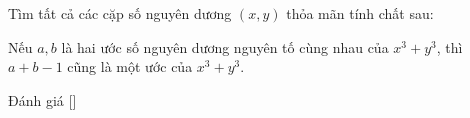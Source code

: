 \ifshowproblem
\begin{problem}\label{problem:BMO-2015-SL-P4}
    Tìm tất cả các cặp số nguyên dương \( (x, y) \) thỏa mãn tính chất sau:

    Nếu \( a, b \) là hai ước số nguyên dương nguyên tố cùng nhau của \( x^3 + y^3 \),  
    thì \( a + b - 1 \) cũng là một ước của \( x^3 + y^3 \).
\end{problem}
\fi

\ifshowinfo
Đánh giá [\textbf{}]\footnotemark
{}
\fi